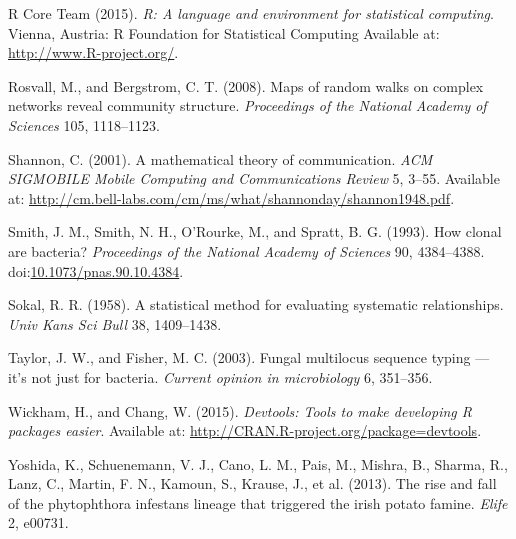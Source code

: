 \documentclass{frontiersSCNS} %
\begin{document}
R Core Team (2015). \emph{R: A language and environment for statistical
computing}. Vienna, Austria: R Foundation for Statistical Computing
Available at: \url{http://www.R-project.org/}.

Rosvall, M., and Bergstrom, C. T. (2008). Maps of random walks on
complex networks reveal community structure. \emph{Proceedings of the
National Academy of Sciences} 105, 1118--1123.

Shannon, C. (2001). A mathematical theory of communication. \emph{ACM
SIGMOBILE Mobile Computing and Communications Review} 5, 3--55.
Available at:
\url{http://cm.bell-labs.com/cm/ms/what/shannonday/shannon1948.pdf}.

Smith, J. M., Smith, N. H., O'Rourke, M., and Spratt, B. G. (1993). How
clonal are bacteria? \emph{Proceedings of the National Academy of
Sciences} 90, 4384--4388.
doi:\href{http://dx.doi.org/10.1073/pnas.90.10.4384}{10.1073/pnas.90.10.4384}.

Sokal, R. R. (1958). A statistical method for evaluating systematic
relationships. \emph{Univ Kans Sci Bull} 38, 1409--1438.

Taylor, J. W., and Fisher, M. C. (2003). Fungal multilocus sequence
typing --- it's not just for bacteria. \emph{Current opinion in
microbiology} 6, 351--356.

Wickham, H., and Chang, W. (2015). \emph{Devtools: Tools to make
developing R packages easier}. Available at:
\url{http://CRAN.R-project.org/package=devtools}.

Yoshida, K., Schuenemann, V. J., Cano, L. M., Pais, M., Mishra, B.,
Sharma, R., Lanz, C., Martin, F. N., Kamoun, S., Krause, J., et al.
(2013). The rise and fall of the phytophthora infestans lineage that
triggered the irish potato famine. \emph{Elife} 2, e00731.
\end{document}
